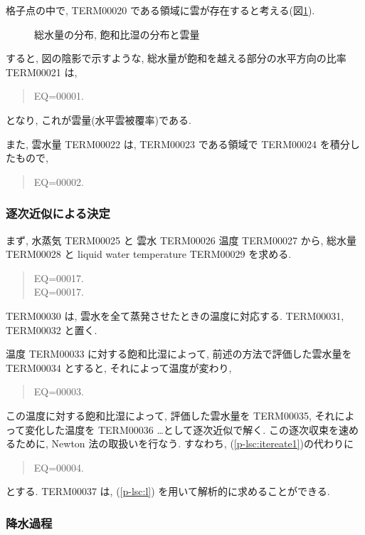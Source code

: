 格子点の中で,
TERM00020 である領域に雲が存在すると考える(図\ref{lsc:fig-cloud}).

\begin{figure}[hbtp]
  \begin{center}
  \end{center}
  \caption{総水量の分布, 飽和比湿の分布と雲量}
  \label{lsc:fig-cloud}
\end{figure}


すると, 図の陰影で示すような,
総水量が飽和を越える部分の水平方向の比率 TERM00021 は,
\begin{quote}
EQ=00001.
\end{quote}
となり, これが雲量(水平雲被覆率)である.

また, 雲水量 TERM00022 は, TERM00023 である領域で
TERM00024 を積分したもので,
\begin{quote}
EQ=00002.
\label{p-lsc:l}
\end{quote}

\subsubsection{逐次近似による決定}

まず, 水蒸気 TERM00025 と 雲水 TERM00026 温度 TERM00027 から,
総水量 TERM00028 と liquid water temperature TERM00029 を求める.
\begin{quote}
EQ=00017.\\
EQ=00017.
\end{quote}
TERM00030 は, 雲水を全て蒸発させたときの温度に対応する.
TERM00031, TERM00032 と置く.

温度 TERM00033 に対する飽和比湿によって, 
前述の方法で評価した雲水量を TERM00034 とすると,
それによって温度が変わり,
\begin{quote}
EQ=00003.
\label{p-lsc:itereate1}
\end{quote}
この温度に対する飽和比湿によって, 評価した雲水量を TERM00035,
それによって変化した温度を TERM00036 \ldots として逐次近似で解く.
この逐次収束を速めるために, Newton 法の取扱いを行なう.
すなわち, (\ref{p-lsc:itereate1})の代わりに
\begin{quote}
EQ=00004.
\end{quote}
とする.
TERM00037 は, (\ref{p-lsc:l}) を用いて解析的に求めることができる.

\subsubsection{降水過程}

